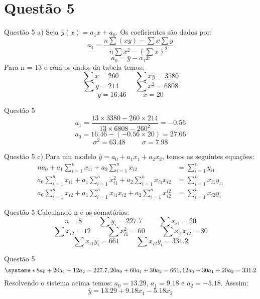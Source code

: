 \documentclass[fleqn]{beamer}\usepackage[]{graphicx}\usepackage[]{color}
\begin{document}
	\section{Questão 5}
		\begin{frame}{Questão 5}
			a)  Seja $\hat{y}(x) = a_{1}x + a_{0}$.  Os coeficientes são dados por:
			$$a_{1} = \frac{n\sum (xy) - \sum x \sum y}{n\sum x^{2} - (\sum x)^2}$$
			$$a_{0} = \bar{y} - a_{1}\bar{x}$$
			Para n = 13 e com os dados da tabela temos:
			$$\sum x = 260 \hspace{1cm} \sum xy = 3580$$
			$$\sum y = 214 \hspace{1cm} \sum x^{2} = 6808$$
			$$\bar{y} = 16.46 \hspace{1cm} \bar{x} = 20$$
		\end{frame}
		\begin{frame}{Questão 5}
			$$a_{1} = \frac{13\times3380 - 260\times214}{13\times6808 - 260^{2}} = -0.56$$
			$$a_{0} = 16.46 - (-0.56\times20) = 27.66$$
			$$\sigma^{2} = 63.48 \hspace{1cm} \sigma = 7.98$$
		\end{frame}
		\begin{frame}{Questão 5}
			c)  Para um modelo $\hat{y} = a_{0} + a_{1}x_{1} + a_{2}x_{2}$, temos as seguintes equações:
			\begin{align*}
				na_{0} + a_{1}\sum_{i=1}^{n} x_{i1} + a_{2}\sum_{i=1}^{n} x_{i2} &= \sum_{i=1}^{n} y_{i1}\\
				a_{0}\sum_{i=1}^{n} x_{i1} + a_{1}\sum_{i=1}^{n} x_{i1}^{2} + a_{2}\sum_{i=1}^{n} x_{i1} x_{i2} &= \sum_{i=1}^{n} x_{i1} y_{i1}\\
				a_{0}\sum_{i=1}^{n} x_{i2} + a_{1}\sum_{i=1}^{n} x_{i1} x_{i2} + a_{2}\sum_{i=1}^{n} x_{i2}^{i2} &= \sum_{i=1}^{n} x_{i2} y_{i}   
			\end{align*}
		\end{frame}
		\begin{frame}{Questão 5}
			Calculando n e os somatórios:
			$$n = 8\hspace{1cm} \sum y_{i} = 227.7 \hspace{1cm} \sum x_{i1} = 20$$
			$$\sum x_{i2} = 12 \hspace{1cm} \sum x_{i1}^2 = 60 \hspace{1cm} \sum x_{i1} x_{i2} = 30$$
			$$\sum x_{i1} y_{i} = 661 \hspace{1cm} \sum x_{i2} y_{i} = 331.2$$
		\end{frame}
		\begin{frame}{Questão 5}
			\[
				\systeme*{8a_{0} + 20a_{1} + 12a_{2} = 227.7,20a_{0} + 60a_{1} + 30a_{2} = 661,12a_{0} + 30a_{1} + 20a_{2} = 331.2}
			\]
			Resolvendo o sistema acima temos: $a_{0} = 13.29$, $a_{1} = 9.18$ e $a_{2} = -5.18$.
			Asssim:
			\[ \hat{y} = 13.29 + 9.18x_{1} - 5.18x_{2}\]
		\end{frame}
\end{document}
